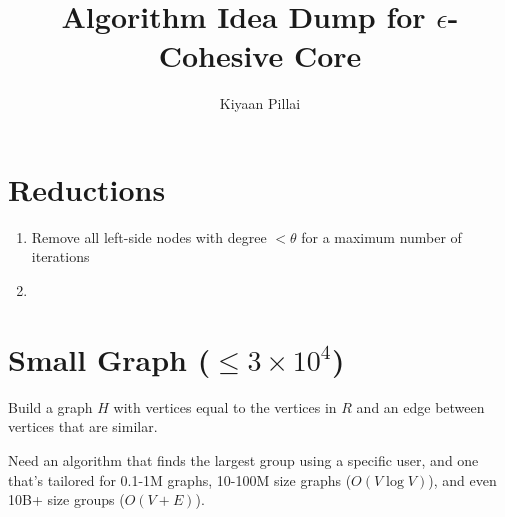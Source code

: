 \usepackage{amsmath}
\usepackage{algorithm}
\usepackage{algpseudocodex}

\title{Algorithm Idea Dump for $\epsilon$-Cohesive Core}
\author{Kiyaan Pillai}

\section{Reductions}

\begin{enumerate}
    \item Remove all left-side nodes with degree $< \theta$ for a maximum number of iterations
    \item 
\end{enumerate}

\section{Small Graph ($\le 3 \times 10^4$)}

Build a graph $H$ with vertices equal to the vertices in $R$ and an edge between vertices that are similar.

Need an algorithm that finds the largest group using a specific user, and one that's tailored for 0.1-1M graphs, 10-100M size graphs ($O(V\log V)$), and even 10B+ size groups ($O(V + E)$).